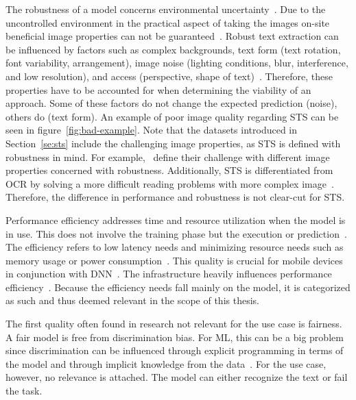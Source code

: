 The robustness of a model concerns environmental uncertainty~\citep{ashmore_assuring_2021}.
Due to the uncontrolled environment in the practical aspect of taking the images on-site
beneficial image properties can not be guaranteed~\citep{chen_text_2021}.
Robust text extraction can be influenced by factors such as complex backgrounds, text form
(text rotation, font variability, arrangement), image noise (lighting conditions, blur,
interference, and low resolution), and access (perspective, shape of
text)~\citep{oyedotun_deep_2015,ghosh_visual_2017,chen_text_2021}.
Therefore, these properties have to be accounted for when determining the viability of an approach.
Some of these factors do not change the expected prediction (noise), others do (text
form)\cite{hu_towards_2020}.
An example of poor image quality regarding \ac{STS} can be seen in figure~\ref{fig:bad-example}.
Note that the datasets introduced in Section~\ref{se:sts} include the challenging image properties,
as \ac{STS} is defined with robustness in mind.
For example,~\cite{karatzas_icdar_2013,karatzas_icdar_2015,chng_total-text_2017} define their
challenge with different image properties concerned with robustness.
Additionally, \ac{STS} is differentiated from \ac{OCR} by solving a more difficult reading problems
with more complex image~\citep{long_scene_2021,hu_gtc_2020,chen_text_2021,baek_what_2019}.
Therefore, the difference in performance and robustness is not clear-cut for \ac{STS}.

Performance efficiency addresses time and resource utilization when the model is in use.
This does not involve the training phase but the execution or
prediction~\citep{siebert_construction_2021}.
The efficiency refers to low latency needs and minimizing resource needs such as memory
usage or power consumption~\citep{nakamichi_requirements-driven_2020, siebert_construction_2021,
sourvanos_challenges_2018}.
This quality is crucial for mobile devices in conjunction with
\ac{DNN}~\citep{sourvanos_challenges_2018, niu_26ms_2019}.
The infrastructure heavily influences performance
efficiency~\citep{nakamichi_requirements-driven_2020, siebert_construction_2021}.
Because the efficiency needs fall mainly on the model, it is categorized as such and thus deemed
relevant in the scope of this thesis.

The first quality often found in research not relevant for the use case is fairness.
A fair model is free from discrimination bias.
For \ac{ML}, this can be a big problem since discrimination can be influenced through
explicit programming in terms of the model and through implicit knowledge from the
data~\citep{vogelsang_requirements_2019}.
For the use case, however, no relevance is attached.
The model can either recognize the text or fail the task.

